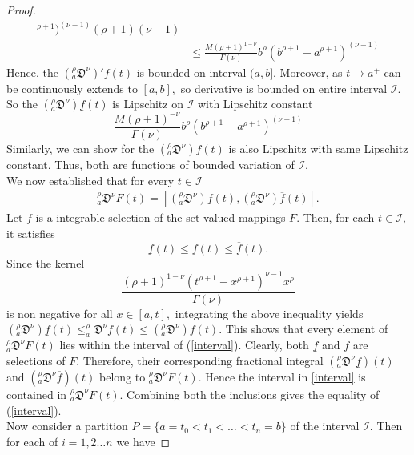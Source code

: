 \documentclass{amsproc}
\theoremstyle{definition}
\theoremstyle{remark}
\numberwithin{equation}{section}
\begin{document}
\begin{proof}
\begin{equation*}
\begin{aligned}
{        ^{\rho+1})^{(\nu-1)}}{(\rho+1)(\nu-1)}\\
        &\le \frac{M(\rho+1)^{1-\nu}}{\Gamma(\nu)} b^\rho (b^{\rho+1}-a
        ^{\rho+1})^{(\nu-1)}
    \end{aligned}
\end{equation*}
Hence, the $(_a^\rho\mathfrak{D}^\nu)' \underline{f}(t)$ is bounded on interval $(a,b].$ Moreover, as $ t \to a ^+$ can be continuously extends to $[a,b],$ so derivative is bounded on entire interval $\mathcal{I}.$ So the $(_a^\rho\mathfrak{D}^\nu)\underline{f}(t)$ is Lipschitz on $\mathcal{I}$ with Lipschitz constant 
\[ \frac{M(\rho+1)^{-\nu}}{\Gamma(\nu)} b^\rho (b^{\rho+1}-a
        ^{\rho+1})^{(\nu-1)} \]
        Similarly, we can show for the $(_a^\rho\mathfrak{D}^\nu) \overline{f}(t)$ is also Lipschitz with same Lipschitz constant. Thus, both are functions of bounded variation of $\mathcal{I}.$\\
        We now established that for every $t\in \mathcal{I}$
    \begin{equation} \label{interval}
        \begin{aligned}  
     _a^\rho\mathfrak{D}^\nu F(t)=[(_a^\rho\mathfrak{D}^\nu) \underline{f}(t),(_a^\rho\mathfrak{D}^\nu)\overline{f}(t) ]. 
       \end{aligned}
    \end{equation}  
        Let $f$ is a integrable selection of the set-valued mappings $F.$ Then, for each $t\in \mathcal{I},$ it satisfies 
        \[ \underline{f}(t)\le f(t) \le \overline{f}(t).\] 
        Since the kernel \[\frac{(\rho+1)^{1-\nu}(t^{\rho+1}-x^{\rho+1})^{\nu-1}x^{\rho}}{\Gamma(\nu)}\] is non negative for all $x\in [a,t],$ integrating the above inequality yields $ (_a^\rho\mathfrak{D}^\nu) \underline{f}(t) \le _a^\rho\mathfrak{D}^\nu f(t)\le  (_a^\rho\mathfrak{D}^\nu) \overline{f}(t).$ 
        This shows that every element of $ _a^\rho\mathfrak{D}^\nu F(t) $ lies within the  interval of (\ref{interval}). Clearly, both $\underline{f}$ and $\overline{f}$ are selections of $F.$ Therefore, their corresponding fractional integral $(_a^\rho\mathfrak{D}^\nu \underline{f})(t)$ and $(_a^\rho\mathfrak{D}^\nu \overline{f})(t)$ belong to $_a^\rho\mathfrak{D}^\nu F(t).$ Hence the interval in \ref{interval} is contained in $_a^\rho\mathfrak{D}^\nu F(t).$ Combining both the inclusions gives the equality of (\ref{interval}).\\
      Now consider a partition $P=\{a=t_0<t_1<\ldots <t_n=b \}$ of the interval $\mathcal{I}.$ Then for each of $i=1,2\ldots n$ we have 

\end{proof}
\end{document}
